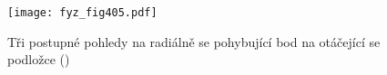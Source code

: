   \begin{figure}[ht!] %
    \centering
    \texttt{[image: fyz\_fig405.pdf]}
    \caption{Tři postupné pohledy na radiálně se pohybující bod na otáčející se podložce
             (\cite[s.~269]{Feynman01})}
    \label{fyz_fig405}
  \end{figure}
  
\printbibliography[title={Seznam literatury}, heading=subbibliography]
